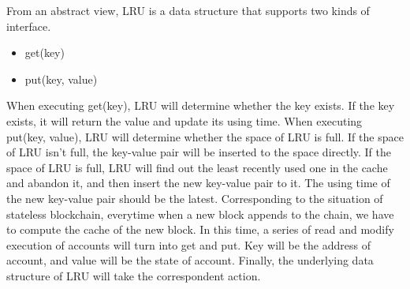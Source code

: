 \documentclass[conference]{IEEEtran}
\begin{document}
From an abstract view, LRU is a data structure that supports two kinds of interface.
\begin{itemize}
\item get(key)
\item put(key, value)
\end{itemize}
When executing get(key), LRU will determine whether the key exists. If the key exists, it will return the value and update its using time.
When executing put(key, value), LRU will determine whether the space of LRU is full. If the space of LRU isn’t full, the key-value pair will be inserted to the space directly.  If the space of LRU is full, LRU will find out the least recently used one in the cache and abandon it, and then insert the new key-value pair to it. The using time of the new key-value pair should be the latest.
Corresponding to the situation of stateless blockchain, everytime when a new block appends to the chain, we have to compute the cache of the new block. In this time, a series of read and modify execution of accounts will turn into get and put. Key will be the address of account, and value will be the state of account. Finally, the underlying data structure of LRU will take the correspondent action.
\end{document}
